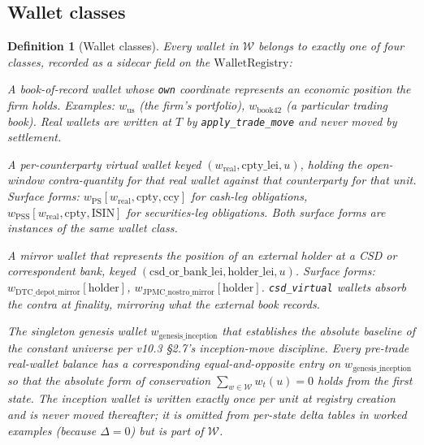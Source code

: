 \documentclass[11pt,a4paper]{article}
\newtheorem{definition}{Definition}[section]
\begin{document}
\subsection{Wallet classes}

\begin{definition}[Wallet classes]
\label{def:wallet-classes}
Every wallet in $\mathcal{W}$ belongs to exactly one of four classes, recorded as a sidecar field on the $\mathrm{WalletRegistry}$:
\begin{description}[style=nextline,leftmargin=1.5em]
\item[\texttt{real}] A book-of-record wallet whose \texttt{own} coordinate represents an economic position the firm holds. Examples: $w_{\mathrm{us}}$ (the firm's portfolio), $w_{\mathrm{book42}}$ (a particular trading book). Real wallets are written at $T$ by \texttt{apply\_trade\_move} and never moved by settlement.
\item[\texttt{cpty\_virtual}] A per-counterparty virtual wallet keyed $(w_{\mathrm{real}}, \text{cpty\_lei}, u)$, holding the open-window contra-quantity for that real wallet against that counterparty for that unit. Surface forms: $w_{\mathrm{PS}}[w_{\mathrm{real}}, \mathrm{cpty}, \mathrm{ccy}]$ for cash-leg obligations, $w_{\mathrm{PSS}}[w_{\mathrm{real}}, \mathrm{cpty}, \mathrm{ISIN}]$ for securities-leg obligations. Both surface forms are instances of the same wallet class.
\item[\texttt{csd\_virtual}] A mirror wallet that represents the position of an external holder at a CSD or correspondent bank, keyed $(\mathrm{csd\_or\_bank\_lei}, \mathrm{holder\_lei}, u)$. Surface forms: $w_{\mathrm{DTC\_depot\_mirror}}[\text{holder}]$, $w_{\mathrm{JPMC\_nostro\_mirror}}[\text{holder}]$. \texttt{csd\_virtual} wallets absorb the contra at finality, mirroring what the external book records.
\item[\texttt{inception}] The singleton genesis wallet $w_{\mathrm{genesis\_inception}}$ that establishes the absolute baseline of the constant universe per v10.3 \S2.7's inception-move discipline. Every pre-trade real-wallet balance has a corresponding equal-and-opposite entry on $w_{\mathrm{genesis\_inception}}$ so that the absolute form of conservation $\sum_{w \in \mathcal{W}} w_t(u) = 0$ holds from the first state. The inception wallet is written exactly once per unit at registry creation and is never moved thereafter; it is omitted from per-state delta tables in worked examples (because $\Delta = 0$) but is part of $\mathcal{W}$.
\end{description}
\end{definition}
\end{document}
